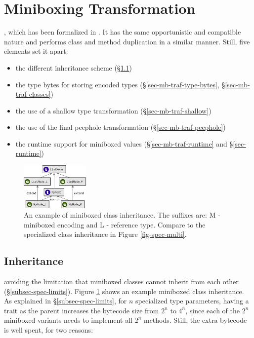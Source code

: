 \section{Miniboxing Transformation}
\label{sec-mb-traf}

, which has been formalized in \cite{iuli-thesis}. It has the same opportunistic and compatible nature and performs class and method duplication in a similar manner. Still, five elements set it apart:

\begin{itemize}
\item the different inheritance scheme (\S\ref{sec-mb-traf-inheritance})
\item the type bytes for storing encoded types (\S\ref{sec-mb-traf-type-bytes}, \S\ref{sec-mb-traf-classes})
\item the use of a shallow type transformation (\S\ref{sec-mb-traf-shallow})
\item the use of the final peephole transformation (\S\ref{sec-mb-traf-peephole})
\item the runtime support for miniboxed values (\S\ref{sec-mb-traf-runtime} and \S\ref{sec-runtime})
\end{itemize}

\begin{figure}[t]
    \centering
    \includegraphics[width=0.30\textwidth]{diags/mbox-multi.eps}

    \caption{An example of miniboxed class inheritance. The suffixes are: M - miniboxed encoding and L - reference type. Compare to the specialized class inheritance in Figure \ref{fig-spec-multi}.}
    \label{fig-mbox-multi}
\end{figure}


\subsection{Inheritance}
\label{sec-mb-traf-inheritance}
 avoiding the limitation that miniboxed classes cannot  inherit from each other (\S\ref{subsec-spec-limits}). Figure \ref{fig-mbox-multi} shows an example miniboxed class inheritance. As explained in \S\ref{subsec-spec-limits}, for $n$ specialized type parameters, having a trait as the parent increases the bytecode size from $2^n$ to $4^n$, since each of the $2^n$ miniboxed variants needs to implement all $2^n$ methods. Still, the extra bytecode is well spent, for two reasons:

